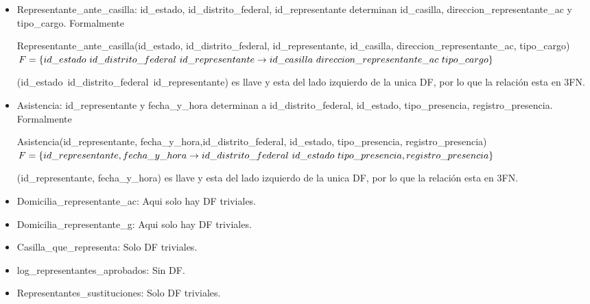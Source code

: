 \documentclass[a4paper,twoside,11pt]{article}
\begin{document}
\begin{itemize}
  \item Representante\_ante\_casilla: id\_estado, id\_distrito\_federal, id\_representante determinan
        id\_casilla, direccion\_representante\_ac y tipo\_cargo. Formalmente

        Representante\_ante\_casilla(id\_estado, id\_distrito\_federal, id\_representante,
        id\_casilla, direccion\_representante\_ac, tipo\_cargo)\\
        $F=\{id\_estado~id\_distrito\_federal~id\_representante\rightarrow\\
        id\_casilla~direccion\_representante\_ac~tipo\_cargo\}$

        (id\_estado~id\_distrito\_federal~id\_representante) es llave y esta del lado izquierdo de la unica DF,
        por lo que la relación esta en 3FN.

  \item Asistencia: id\_representante y fecha\_y\_hora determinan a id\_distrito\_federal, id\_estado,
        tipo\_presencia, registro\_presencia. Formalmente

        Asistencia(id\_representante, fecha\_y\_hora,id\_distrito\_federal, id\_estado, tipo\_presencia, registro\_presencia)\\
        $F=\{id\_representante, fecha\_y\_hora \rightarrow \\
        id\_distrito\_federal~id\_estado~tipo\_presencia, registro\_presencia\}$

        (id\_representante, fecha\_y\_hora) es llave y esta del lado izquierdo de la unica DF,
        por lo que la relación esta en 3FN.
        
  \item Domicilia\_representante\_ac: Aqui solo hay DF triviales.
  \item Domicilia\_representante\_g: Aqui solo hay DF triviales.
  \item Casilla\_que\_representa: Solo DF triviales.
  \item log\_representantes\_aprobados: Sin DF.
  \item Representantes\_sustituciones: Solo DF triviales.

\end{itemize}
\end{document}
